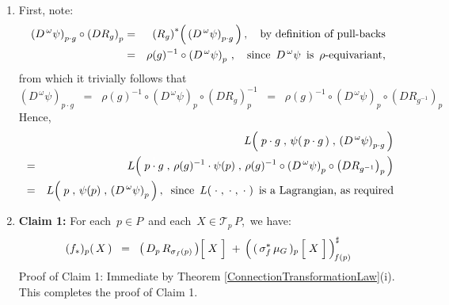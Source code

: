 \begin{enumerate}
\item
    First, note:
    \begin{eqnarray*}
    \left(D^{\,\omega}\psi\right)_{p \cdot g}
    \circ
    \left(DR_{g}\right)_{p}
    & = &
        \left(R_{g}\right)^{*}\!\left(\,
            \left(D^{\,\omega}\psi\right)_{p \cdot g}
            \,\right),
        \quad
        \textnormal{by definition of pull-backs}
    \\
    & = &
            \rho(g)^{-1}
            \circ
            \left(D^{\,\omega}\psi\right)_{p}\,,
        \quad
        \textnormal{since \,$D^{\,\omega}\psi$\, is \,$\rho$-equivariant,}
    \end{eqnarray*}
    from which it trivially follows that
    \begin{equation*}
    \left(D^{\,\omega}\psi\right)_{p \cdot g}
    \;\; = \;\;
        \rho(g)^{-1}
        \circ
        \left(D^{\,\omega}\psi\right)_{p}
        \circ
        \left(DR_{g}\right)_{p}^{-1}
    \;\; = \;\;
        \rho(g)^{-1}
        \circ
        \left(D^{\,\omega}\psi\right)_{p}
        \circ
        \left(DR_{g^{-1}}\right)_{p}
    \end{equation*}
    Hence,
    \begin{eqnarray*}
    &&
	    L\!\left(\;
	        \overset{{\color{white}1}}{p \cdot g}
	        \;,\,
	        \psi(\,p\cdot g\,)
	        \;,\,
	        \left(D^{\,\omega}\psi\right)_{p \cdot g}
	        \,\right)
    \\
    & = &
	    L\!\left(\;
	        \overset{{\color{white}1}}{p \cdot g}
	        \;,\,
	        \rho(g)^{-1} \cdot \psi(p)
	        \;,\,
            \rho(g)^{-1}
            \circ
            \left(D^{\,\omega}\psi\right)_{p}
            \circ
            \left(DR_{g^{-1}}\right)_{p}
	        \,\right)
    \\
    & = &
	    L\!\left(\;
	        \overset{{\color{white}1}}{p}
	        \;,\,
	        \psi(p)
	        \;,\,
            \left(D^{\,\omega}\psi\right)_{p}
	        \,\right),
        \;\;\textnormal{since \,$L(\;\cdot\;,\;\cdot\;,\;\cdot\;)$\, is a Lagrangian, as required}
    \end{eqnarray*}
\item
    \noindent
    \textbf{Claim 1:}\;
	For each \,$p \in P$\, and each \,$X \in \mathcal{T}_{p}\,P$,\, we have:
	\begin{equation*}
	(f_{*})_{p}(\,X\,)
	\;\; = \;\;
		\left(\,D_{p}\,R_{\sigma_{f}(p)}\,\right)\!\left[\;\overset{{\color{white}.}}{X}\;\right]
		\; + \,
		\left(\,
			(\,\sigma_{f}^{*}\,\mu_{G}\,)_{p}
			\left[\;\overset{{\color{white}.}}{X}\;\right]
			\,\right)^{\sharp}_{\!f(p)}
	\end{equation*}
    \vskip -0.2cm
    \noindent
    Proof of Claim 1:\;
    Immediate by Theorem \ref{ConnectionTransformationLaw}(i).
    This completes the proof of Claim 1.


\end{enumerate}
